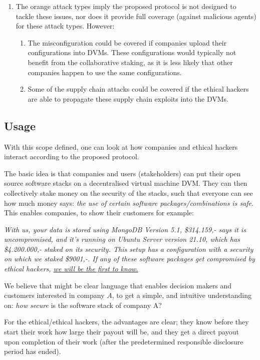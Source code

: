 \begin{enumerate} 
    \item The orange attack types imply the proposed protocol is not designed to tackle these issues, nor does it provide full coverage (against malicious agents) for these attack types. However:
    \begin{enumerate}
        \item The misconfiguration could be covered if companies upload their configurations into DVMs. These configurations would typically not benefit from the collaborative staking, as it is less likely that other companies happen to use the same configurations.
        \item Some of the supply chain attacks could be covered if the ethical hackers are able to propagate these supply chain exploits into the DVMs.
    \end{enumerate}
\end{enumerate}

\subsection{Usage}
\noindent With this scope defined, one can look at how companies and ethical hackers interact according to the proposed protocol.

\noindent The basic idea is that companies and users (stakeholders) can put their open source software stacks on a decentralised virtual machine DVM. They can then collectively stake money on the security of the stacks, such that everyone can see how much money says: \textit{the use of certain software packages/combinations is safe}. This enables companies, to show their customers for example:

\noindent \textit{With us, your data is stored using MongoDB Version 5.1, \$314.159,- says it is uncompromised, and it's running on Ubuntu Server version 21.10, which has \$4.200.000,- staked on its security. This setup has a configuration with a security on which we staked \$9001,-. If any of these software packages get compromised by ethical hackers, \underline{we will be the first to know.}}

\noindent We believe that might be clear language that enables decision makers and customers interested in company $A$, to get a simple, and intuitive understanding on: \textit{how secure} is the software stack of company A?

\noindent For the ethical/ethical hackers, the advantages are clear; they know before they start their work how large their payout will be, and they get a direct payout upon completion of their work (after the predetermined responsible disclosure period has ended).

